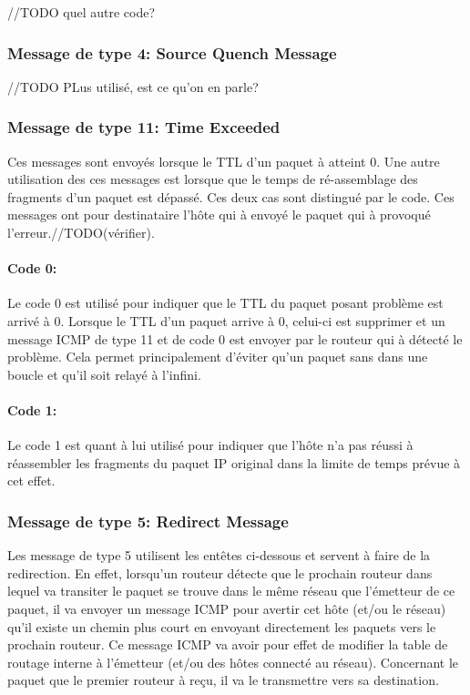 //TODO quel autre code?



\subsubsection{Message de type 4: Source Quench Message}
//TODO PLus utilisé, est ce qu'on en parle?

\subsubsection{Message de type 11: Time Exceeded}
Ces messages sont envoyés lorsque le TTL d'un paquet à atteint 0. Une autre
utilisation des ces messages est lorsque que le temps de ré-assemblage des
fragments d'un paquet est dépassé. Ces deux cas sont distingué par le code. Ces
messages ont pour destinataire l'hôte qui à envoyé le paquet qui à provoqué
l'erreur.//TODO(vérifier).

\paragraph{Code 0:}
Le code 0 est utilisé pour indiquer que le TTL du paquet posant problème est arrivé à 0.
Lorsque le TTL d'un paquet arrive à 0, celui-ci est supprimer et un message
ICMP de type 11 et de code 0 est envoyer par le routeur qui à détecté le
problème. Cela permet principalement d'éviter qu'un paquet sans dans une boucle
et qu'il soit relayé à l'infini.

\paragraph{Code 1:} Le code 1 est quant à lui utilisé pour indiquer que l'hôte n'a pas
réussi à réassembler les fragments du paquet IP original dans la limite de temps prévue
à cet effet.


\subsubsection{Message de type 5: Redirect Message} Les message de type 5 utilisent les entêtes
ci-dessous et servent à faire de la redirection. En effet, lorsqu'un routeur
détecte que le prochain routeur dans lequel va transiter le paquet se trouve
dans le même réseau que l'émetteur de ce paquet, il va envoyer un message ICMP
pour avertir cet hôte (et/ou le réseau) qu'il existe un chemin plus court en
envoyant directement les paquets vers le prochain routeur. Ce message ICMP va
avoir pour effet de modifier la table de routage interne à l'émetteur (et/ou
des hôtes connecté au réseau). Concernant le paquet que le premier routeur à
reçu, il va le transmettre vers sa destination.


